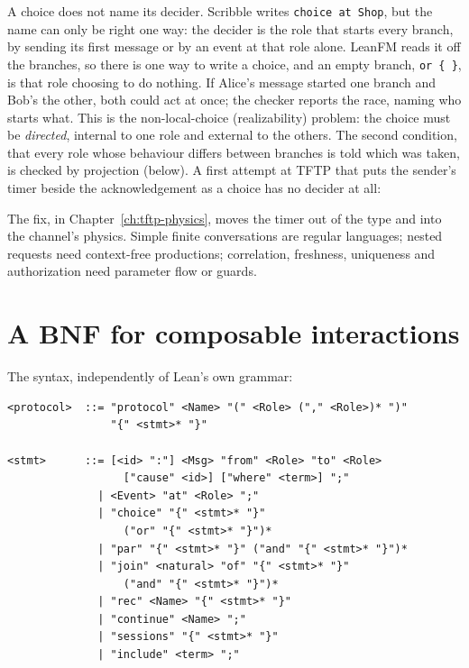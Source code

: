 A choice does not name its decider. Scribble writes \texttt{choice at Shop}, but
the name can only be right one way: the decider is the role that starts every
branch, by sending its first message or by an event at that role alone. LeanFM
reads it off the branches, so there is one way to write a choice, and an empty
branch, \texttt{or \{ \}}, is that role choosing to do nothing. If Alice's message
started one branch and Bob's the other, both could act at once; the checker
reports the race, naming who starts what. This is the non-local-choice
(realizability) problem: the choice must be \emph{directed}, internal to one role
and external to the others. The second condition, that every role whose behaviour
differs between branches is told which was taken, is checked by projection
(below). A first attempt at TFTP that puts the sender's timer beside the
acknowledgement as a choice has no decider at all:





The fix, in Chapter~\ref{ch:tftp-physics}, moves the timer out of the type and
into the channel's physics. Simple finite conversations are regular languages;
nested requests need context-free productions; correlation, freshness, uniqueness
and authorization need parameter flow or guards.

\section{A BNF for composable interactions}

The syntax, independently of Lean's own grammar:

\begin{lstlisting}[language={}]
<protocol>  ::= "protocol" <Name> "(" <Role> ("," <Role>)* ")"
                "{" <stmt>* "}"

<stmt>      ::= [<id> ":"] <Msg> "from" <Role> "to" <Role>
                  ["cause" <id>] ["where" <term>] ";"
              | <Event> "at" <Role> ";"
              | "choice" "{" <stmt>* "}"
                  ("or" "{" <stmt>* "}")*
              | "par" "{" <stmt>* "}" ("and" "{" <stmt>* "}")*
              | "join" <natural> "of" "{" <stmt>* "}"
                  ("and" "{" <stmt>* "}")*
              | "rec" <Name> "{" <stmt>* "}"
              | "continue" <Name> ";"
              | "sessions" "{" <stmt>* "}"
              | "include" <term> ";"
\end{lstlisting}

